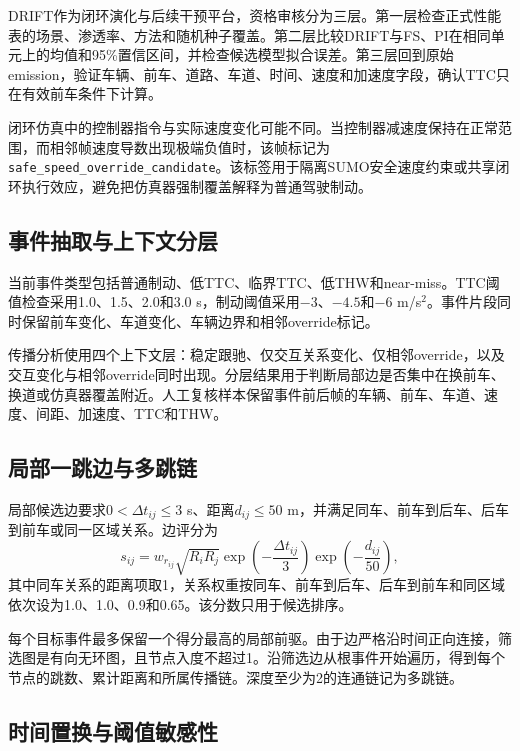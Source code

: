 \documentclass[journal]{IEEEtran}
\begin{document}
DRIFT作为闭环演化与后续干预平台，资格审核分为三层。第一层检查正式性能表的场景、渗透率、方法和随机种子覆盖。第二层比较DRIFT与FS、PI在相同单元上的均值和95\%置信区间，并检查候选模型拟合误差。第三层回到原始emission，验证车辆、前车、道路、车道、时间、速度和加速度字段，确认TTC只在有效前车条件下计算。

闭环仿真中的控制器指令与实际速度变化可能不同。当控制器减速度保持在正常范围，而相邻帧速度导数出现极端负值时，该帧标记为\texttt{safe\_speed\_override\_candidate}。该标签用于隔离SUMO安全速度约束或共享闭环执行效应，避免把仿真器强制覆盖解释为普通驾驶制动。

\subsection{事件抽取与上下文分层}

当前事件类型包括普通制动、低TTC、临界TTC、低THW和near-miss。TTC阈值检查采用1.0、1.5、2.0和3.0 s，制动阈值采用$-3$、$-4.5$和$-6$ m/s$^2$。事件片段同时保留前车变化、车道变化、车辆边界和相邻override标记。

传播分析使用四个上下文层：稳定跟驰、仅交互关系变化、仅相邻override，以及交互变化与相邻override同时出现。分层结果用于判断局部边是否集中在换前车、换道或仿真器覆盖附近。人工复核样本保留事件前后帧的车辆、前车、车道、速度、间距、加速度、TTC和THW。

\subsection{局部一跳边与多跳链}

局部候选边要求$0<\Delta t_{ij}\leq3$ s、距离$d_{ij}\leq50$ m，并满足同车、前车到后车、后车到前车或同一区域关系。边评分为
\begin{equation}
s_{ij}=w_{r_{ij}}\sqrt{R_iR_j}
\exp\!\left(-\frac{\Delta t_{ij}}{3}\right)
\exp\!\left(-\frac{d_{ij}}{50}\right),
\label{eq:local_score}
\end{equation}
其中同车关系的距离项取1，关系权重按同车、前车到后车、后车到前车和同区域依次设为1.0、1.0、0.9和0.65。该分数只用于候选排序。

每个目标事件最多保留一个得分最高的局部前驱。由于边严格沿时间正向连接，筛选图是有向无环图，且节点入度不超过1。沿筛选边从根事件开始遍历，得到每个节点的跳数、累计距离和所属传播链。深度至少为2的连通链记为多跳链。

\subsection{时间置换与阈值敏感性}
\end{document}
